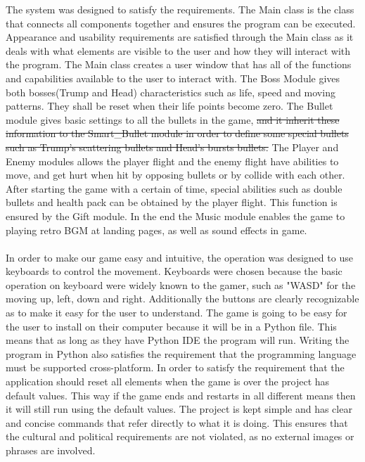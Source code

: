 \documentclass[12,english]{article}
\begin{document}
The system was designed to satisfy the requirements. The Main class is the class that connects all components together and ensures the program can be executed. Appearance and usability requirements are satisfied through the Main class as it deals with what elements are visible to the user and how they will interact with the program. The Main class creates a user window that has all of the functions and capabilities available to the user to interact with. The Boss Module gives both bosses(Trump and Head) characteristics such as life, speed and moving patterns. {\color{red}They shall be reset when their life points become zero.} The Bullet module gives basic settings to all the bullets in the game, \sout{and it inherit these information to the Smart\_Bullet module in order to define some special bullets such as Trump's scattering bullets and Head's bursts bullets.} {\color{red}The Player and Enemy modules allows the player flight and the enemy flight have abilities to move, and get hurt when hit by opposing bullets or by collide with each other.} After starting the game with a certain of time, special abilities such as double bullets and health pack can be obtained by the player flight. This function is ensured by the Gift module. {\color{red}In the end the Music module enables the game to playing retro BGM at landing pages, as well as sound effects in game.}\\\\
In order to make our game easy and intuitive, the operation was designed to use keyboards to control the movement. Keyboards were chosen {\color{red}because the basic operation on keyboard were widely known to the gamer, such as "WASD" for the moving up, left, down and right.} Additionally the buttons are clearly recognizable as to make it easy for the user to understand. The game is going to be easy for the user to install on their computer because it will be in a Python file. This means that as long as they have Python IDE the program will run. Writing the program in Python also satisfies the requirement that the programming language must be supported cross-platform. In order to satisfy the requirement that the application should reset all elements when the game is over the project has default values. This way if the game ends and restarts in all different means then it will still run using the default values. The project is kept simple and has clear and concise commands that refer directly to what it is doing. This ensures that the cultural and political requirements are not violated, as no external images or phrases are involved.
\end{document}
